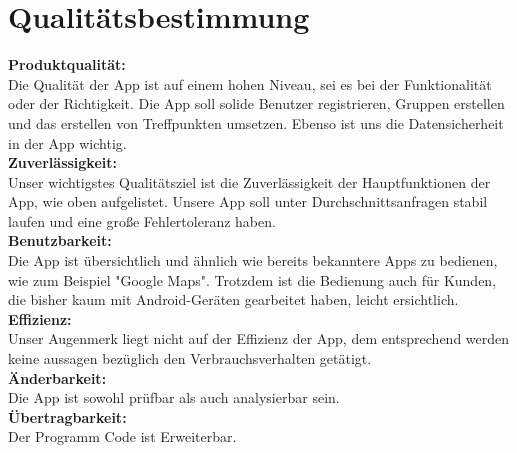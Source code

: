 \section{Qualitätsbestimmung}
\textbf{Produktqualität:}\\ %
Die Qualität der App ist auf einem hohen Niveau, sei es bei der Funktionalität oder der Richtigkeit. Die App soll solide Benutzer registrieren, Gruppen erstellen und das erstellen von Treffpunkten umsetzen. Ebenso ist uns die Datensicherheit in der App wichtig.\\
\textbf{Zuverlässigkeit:}\\%
Unser wichtigstes Qualitätsziel ist die Zuverlässigkeit der Hauptfunktionen der App, wie oben aufgelistet. Unsere App soll unter Durchschnittsanfragen stabil laufen und eine große Fehlertoleranz haben. \\
\textbf{Benutzbarkeit:}\\ %
Die App ist übersichtlich und ähnlich wie bereits bekanntere Apps zu bedienen, wie zum Beispiel "Google Maps". Trotzdem ist die Bedienung auch für Kunden, die bisher kaum mit Android-Geräten gearbeitet haben, leicht ersichtlich.\\
\textbf{Effizienz:}\\ %
Unser Augenmerk liegt nicht auf der Effizienz der App, dem entsprechend werden keine aussagen bezüglich den Verbrauchsverhalten getätigt.\\
\textbf{Änderbarkeit:}\\ %
Die App ist sowohl prüfbar als auch analysierbar sein. \\
\textbf{Übertragbarkeit:}\\%
Der Programm Code ist Erweiterbar.\\